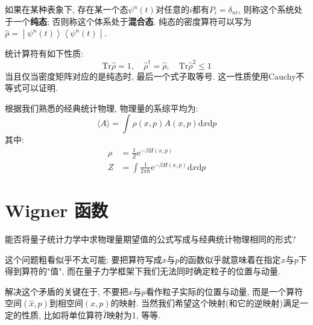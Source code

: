         如果在某种表象下, 存在某一个态$\psi^{n}(t)$对任意的$i$都有$P_i = \delta_{ni}$, 则称这个系统处于一个\textbf{纯态}; 否则称这个体系处于\textbf{混合态}.
        纯态的密度算符可以写为$\hat{\rho} = \left. \middle| {\psi^{n}(t)} \right\rangle \left\langle {\psi^{n}(t)} \middle| \right.$. 

        统计算符有如下性质:
        \begin{equation}
            \mathrm{Tr}\hat\rho = 1, \quad
            \hat\rho^{\dagger} = \hat\rho, \quad
            \mathrm{Tr}\hat\rho^{2} \leq 1
        \end{equation}
        当且仅当密度矩阵对应的是纯态时, 最后一个式子取等号. 这一性质使用Cauchy不等式可以证明. 

        \splitline

        根据我们熟悉的经典统计物理, 物理量的系综平均为: 
        \begin{equation}
            \langle A \rangle = \int \rho(x,p) A(x,p) \mathrm{d}x\mathrm{d}p
        \end{equation}
        其中: 
        \begin{equation}\begin{aligned}
            \rho &= \frac 1Z \mathrm{e}^{-\beta H(x,p)}\\
            Z &= \int \frac 1{2\pi \hbar} \mathrm{e}^{-\beta H(x,p)} \mathrm{d}x \mathrm{d}p
        \end{aligned}\end{equation}

    \section{Wigner 函数}

        能否将量子统计力学中求物理量期望值的公式写成与经典统计物理相同的形式?

        这个问题粗看似乎不太可能: 要把算符写成$x$与$p$的函数似乎就意味着在指定$x$与$p$下得到算符的"值", 而在量子力学框架下我们无法同时确定粒子的位置与动量.

        解决这个矛盾的关键在于, 不要把$x$与$p$看作粒子实际的位置与动量, 而是一个算符空间$(\hat x, \hat p)$到相空间$(x, p)$的映射. 当然我们希望这个映射(和它的逆映射)满足一定的性质, 比如将单位算符$\hat I$映射为1, 等等.

